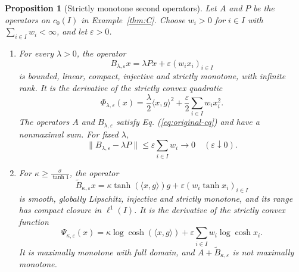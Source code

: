 \documentclass[11pt]{article}
\newcommand{\pair}[2]{\langle #1,#2\rangle}
\newtheorem{proposition}{Proposition}
\theoremstyle{definition}
\theoremstyle{remark}
\begin{document}
\begin{proposition}[Strictly monotone second operators]
\label{cor:strict-partners}
Let $A$ and $P$ be the operators on $c_0(I)$ in Example~\ref{thm:C}. Choose $w_i>0$ for $i\in I$ with $\sum_{i\in I}w_i<\infty$, and let $\varepsilon>0$.
\begin{enumerate}
\item For every $\lambda>0$, the operator
\[
B_{\lambda,\varepsilon}x=\lambda Px+\varepsilon(w_ix_i)_{i\in I}
\]
is bounded, linear, compact, injective and strictly monotone, with infinite rank. It is the derivative of the strictly convex quadratic
\[
\Phi_{\lambda,\varepsilon}(x)
=\frac{\lambda}{2}\pair{x}{g}^2
+\frac{\varepsilon}{2}\sum_{i\in I}w_ix_i^2.
\]
The operators $A$ and $B_{\lambda,\varepsilon}$ satisfy Eq. (\ref{eq:original-cq}) and have a nonmaximal sum. For fixed $\lambda$,
\[
\|B_{\lambda,\varepsilon}-\lambda P\|\le\varepsilon\sum_{i\in I}w_i\longrightarrow0
\quad(\varepsilon\downarrow0).
\]
\item For $\kappa\ge\frac{\sigma}{\tanh1}$, the operator
\[
\widetilde B_{\kappa,\varepsilon}x
=\kappa\tanh(\pair{x}{g})g
+\varepsilon(w_i\tanh x_i)_{i\in I}
\]
is smooth, globally Lipschitz, injective and strictly monotone, and its range has compact closure in $\ell^1(I)$. It is the derivative of the strictly convex function
\[
\Psi_{\kappa,\varepsilon}(x)
=\kappa\log\cosh(\pair{x}{g})
+\varepsilon\sum_{i\in I}w_i\log\cosh x_i.
\]
It is maximally monotone with full domain, and $A+\widetilde B_{\kappa,\varepsilon}$ is not maximally monotone.
\end{enumerate}
\end{proposition}
\end{document}
